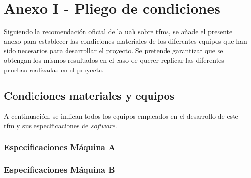 \chapter{Anexo I - Pliego de condiciones}
\label{ch:anexoPliegoCondiciones}

Siguiendo la recomendación oficial de la \gls{uah} sobre \gls{tfm}s, se añade el presente anexo para establecer las condiciones materiales de los diferentes equipos que han sido necesarios para desarrollar el proyecto. Se pretende garantizar que se obtengan los mismos resultados en el caso de querer replicar las diferentes pruebas realizadas en el proyecto.

\section{Condiciones materiales y equipos}

A continuación, se indican todos los equipos empleados en el desarrollo de este \gls{tfm} y sus especificaciones de \textit{software}. 

\subsection{Especificaciones Máquina A} %


\subsection{Especificaciones Máquina B}


